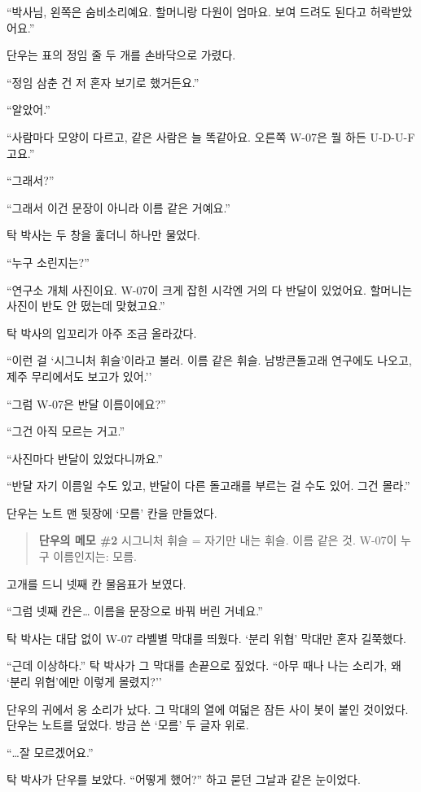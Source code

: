 \documentclass[
  korean,
  letterpaper,
  twoside,
  open=any,
  fontsize=12.5pt,
  headings=small]{scrbook}
\begin{document}
``박사님, 왼쪽은 숨비소리예요.
할머니랑 다원이 엄마요. 보여
드려도 된다고 허락받았어요.''

단우는 표의 정임 줄 두 개를
손바닥으로 가렸다.

``정임 삼춘 건 저 혼자 보기로
했거든요.''

``알았어.''

``사람마다 모양이 다르고, 같은
사람은 늘 똑같아요. 오른쪽
W-07은 뭘 하든
\mbox{U-D-U-F고요.}''

``그래서?''

``그래서 이건 문장이 아니라
이름 같은 거예요.''

탁 박사는 두 창을 훑더니
하나만 물었다.

``누구 소린지는?''

``연구소 개체 사진이요. W-07이
크게 잡힌 시각엔 거의 다
반달이 있었어요. 할머니는
사진이 반도 안 떴는데
맞혔고요.''

탁 박사의 입꼬리가 아주 조금
올라갔다.

``이런 걸 `시그니처
휘슬'이라고 불러. 이름 같은
휘슬. 남방큰돌고래 연구에도
나오고, 제주 무리에서도 보고가
있어.''

``그럼 W-07은 반달
이름이에요?''

``그건 아직 모르는 거고.''

``사진마다 반달이
있었다니까요.''

``반달 자기 이름일 수도 있고,
반달이 다른 돌고래를 부르는 걸
수도 있어. 그건 몰라.''

단우는 노트 맨 뒷장에 `모름'
칸을 만들었다.

\begin{quote}
\textbf{단우의 메모 \#2}
시그니처 휘슬 = 자기만 내는
휘슬. 이름 같은 것. W-07이
누구 이름인지는: 모름.
\end{quote}

고개를 드니 넷째 칸 물음표가
보였다.

``그럼 넷째 칸은\ldots{}
이름을 문장으로 바꿔 버린
거네요.''

탁 박사는 대답 없이 W-07
라벨별 막대를 띄웠다. `분리
위협' 막대만 혼자 길쭉했다.

``근데 이상하다.'' 탁 박사가
그 막대를 손끝으로 짚었다.
``아무 때나 나는 소리가, 왜
`분리 위협'에만 이렇게
몰렸지?''

단우의 귀에서 웅 소리가 났다.
그 막대의 열에 여덟은 잠든
사이 봇이 붙인 것이었다.
단우는 노트를 덮었다. 방금 쓴
`모름' 두 글자 위로.

``\ldots 잘 모르겠어요.''

탁 박사가 단우를 보았다.
``어떻게 했어?'' 하고 묻던
그날과 같은 눈이었다.
\end{document}
